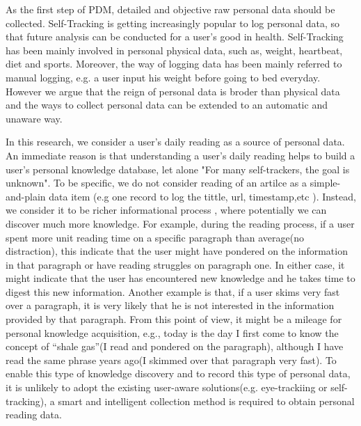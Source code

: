 \documentclass{sigchi}
\begin{document}
 
As the first step of PDM, detailed and objective raw personal data should be collected. Self-Tracking\cite{swan2009emerging,wolf2010data} is getting increasingly popular to log personal data, so that future analysis can be conducted for a user’s good in health. Self-Tracking has been mainly involved in personal physical data, such as, weight, heartbeat, diet and sports. Moreover, the way of logging data has been mainly referred to manual logging, e.g. a user input his weight before going to bed everyday. However we argue that the reign of personal data is broder than physical data and the ways to collect personal data can be extended to an automatic and unaware way. 


In this research, we consider a user’s daily reading as a source of personal data. An immediate reason is that understanding a user's daily reading helps to build a user’s personal knowledge database, let alone "For many self-trackers, the goal is unknown"\cite{wolf2010data}. To be specific, we do not consider reading of an artilce as a simple-and-plain data item (e.g one record to log the tittle, url, timestamp,etc ). Instead, we consider it to be richer informational process , where potentially we can discover much more knowledge. For example, during the reading process, if a user spent more unit reading time on a specific paragraph  than average(no distraction), this indicate that the user might have pondered on the information in that paragraph or have reading struggles on paragraph one. In either case, it might indicate that the user has encountered new knowledge and he takes time to digest this new information. Another example is that, if a user skims very fast over a paragraph, it is very likely that he is not interested in the information provided by that paragraph.  From this point of view, it might be a mileage for personal knowledge acquisition, e.g., today is the day I first come to know the concept of “shale gas”(I read and pondered on the paragraph), although I have read the same phrase years ago(I skimmed over that paragraph very fast). To enable this type of knowledge discovery and to record this type of personal data, it is unlikely to adopt the existing user-aware solutions(e.g. eye-trackiing or self-tracking), a smart and intelligent collection method is required to obtain personal reading data. 
\end{document}

